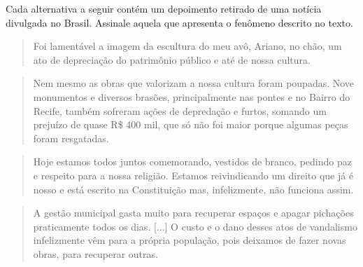 \pagebreak
Cada alternativa a seguir contém um depoimento retirado de uma notícia divulgada
no Brasil. Assinale aquela que apresenta o fenômeno descrito no texto.

\begin{escolha}
\item
\begin{quote}
Foi lamentável a imagem da escultura do meu avô, Ariano, no chão, um 
ato de depreciação do patrimônio público e até de nossa cultura.

\end{quote}

\item
\begin{quote}
Nem mesmo as obras que valorizam a nossa cultura foram poupadas. Nove 
monumentos e diversos brasões, principalmente nas pontes e no Bairro 
do Recife, também sofreram ações de depredação e furtos, somando um 
prejuízo de quase R\$ 400 mil, que só não foi maior porque algumas 
peças foram resgatadas.

\end{quote}

\item
\begin{quote}
Hoje estamos todos juntos comemorando, vestidos de branco, pedindo 
paz e respeito para a nossa religião. Estamos reivindicando um direito 
que já é nosso e está escrito na Constituição mas, infelizmente, não 
funciona assim.

\end{quote}

\item
\begin{quote}
A gestão municipal gasta muito para recuperar espaços e apagar 
pichações praticamente todos os dias. {[}...{]} O custo e o 
dano desses atos de vandalismo infelizmente vêm para a própria 
população, pois deixamos de fazer novas obras, para recuperar 
outras.

\end{quote}

\end{escolha}

